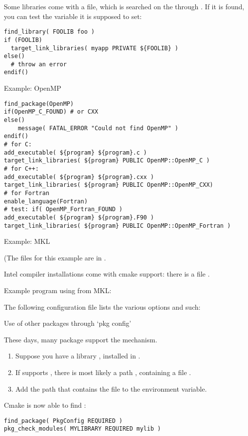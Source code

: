 Some libraries come with a  file,
which is searched on the 
through .
If it is found, you can test the variable it is supposed to set:
\begin{lstlisting}
find_library( FOOLIB foo )
if (FOOLIB)
  target_link_libraries( myapp PRIVATE ${FOOLIB} )
else()
  # throw an error
endif()
\end{lstlisting}

 {Example: OpenMP}

\begin{lstlisting}
find_package(OpenMP)
if(OpenMP_C_FOUND) # or CXX
else()
	message( FATAL_ERROR "Could not find OpenMP" )
endif()
# for C:
add_executable( ${program} ${program}.c )
target_link_libraries( ${program} PUBLIC OpenMP::OpenMP_C )
# for C++:
add_executable( ${program} ${program}.cxx )
target_link_libraries( ${program} PUBLIC OpenMP::OpenMP_CXX)
# for Fortran
enable_language(Fortran)
# test: if( OpenMP_Fortran_FOUND )
add_executable( ${program} ${program}.F90 )
target_link_libraries( ${program} PUBLIC OpenMP::OpenMP_Fortran )
\end{lstlisting}


 {Example: MKL}

(The files for this example are in .

Intel compiler installations come with cmake support:
there is a file .

Example program using  from MKL:


The following configuration file lists the various options and such:
%



 {Use of other packages through `pkg config'}

These days, many package support the  mechanism.
\begin{enumerate}
\item Suppose you have a library , installed in .
\item If  supports , there is most likely a path
  , containing a file .
\item Add the path that contains the  file to the
   environment variable.
\end{enumerate}
Cmake is now able to find :
\begin{lstlisting}
find_package( PkgConfig REQUIRED )
pkg_check_modules( MYLIBRARY REQUIRED mylib )
\end{lstlisting}

